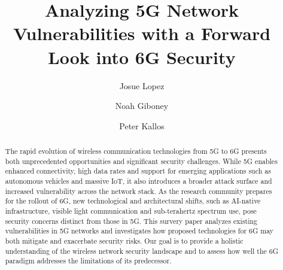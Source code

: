 \documentclass[acmtog]{acmart}
\begin{document}
\title{Analyzing 5G Network Vulnerabilities with a Forward Look into 6G Security}


\author{Josue Lopez}

\author{Noah Giboney}

\author{Peter Kallos}


\renewcommand{\shortauthors}{Lopez et al.}

\begin{abstract}
  The rapid evolution of wireless communication technologies from 5G to 6G presents both
  unprecedented opportunities and significant security challenges. While 5G enables enhanced
  connectivity, high data rates and support for emerging applications such as autonomous vehicles
  and massive IoT, it also introduces a broader attack surface and increased vulnerability across 
  the network stack. As the research community prepares for the rollout of 6G, new technological 
  and architectural shifts, such as AI-native infrastructure, visible light communication and
  sub-terahertz spectrum use, pose security concerns distinct from those in 5G. This survery paper
  analyzes existing vulnerabilities in 5G networks and investigates how proposed technologies for 6G
  may both mitigate and exacerbate security risks. Our goal is to provide a holistic understanding of
  the wireless network security landscape and to assess how well the 6G paradigm addresses the limitations of its predecessor.
\end{abstract}
\end{document}
